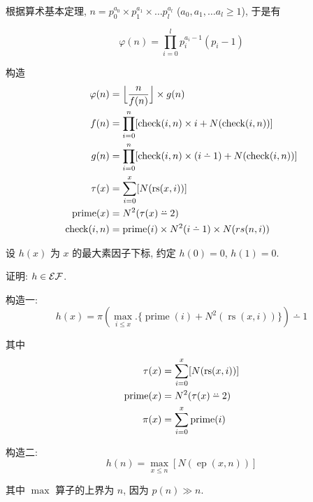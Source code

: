 \begin{solution}
根据算术基本定理, $n = p_0^{a_0} \times p_1^{a_1} \times \dots p_l^{a_l}$ ($a_0, a_1, \dots a_l \ge 1$), 于是有

\[
\varphi(n) = \prod_{i=0}^l p_i^{a_i - 1} (p_i - 1)
\]

构造
\begin{align*}
\varphi(n) & = \Big \lfloor \frac{n}{f(n)} \Big \rfloor \times g(n) \\
f(n) & = \prod_{i = 0}^n [\operatorname{check}(i, n) \times i + N(\operatorname{check}(i, n))] \\
g(n) & = \prod_{i = 0}^n [\operatorname{check}(i, n) \times (i \dotminus 1) + N(\operatorname{check}(i, n))] \\
\tau(x) & = \sum_{i = 0}^x [ N(\operatorname{rs}(x, i)) ] \\
\operatorname{prime}(x) & = N^2( \tau (x) \dotdotminus 2 ) \\
\operatorname{check}(i, n) & = \operatorname{prime}(i) \times N^2(i \dotminus 1) \times N(rs(n, i))
\end{align*}
\end{solution}

\begin{problem}
设 $h(x)$ 为 $x$ 的最大素因子下标, 约定 $h(0) = 0$, $h(1) = 0$.

证明: $h \in \mathcal{EF}$.
\end{problem}

\begin{solution}
构造一:
\[
h(x) = \pi(\max_{i \le x}. \Big \{ \operatorname{prime}(i) + N^2(\operatorname{rs}(x, i)) \Big \}) \dotminus 1
\]

其中
\begin{align*}
\tau(x) & = \sum_{i = 0}^x [ N(\operatorname{rs}(x, i)) ] \\
\operatorname{prime}(x) & = N^2( \tau (x) \dotdotminus 2 ) \\
\pi(x) & = \sum_{i=0}^x \operatorname{prime}(i)
\end{align*}

构造二:
\[
h(n) = \max_{x \le n} [N(\operatorname{ep}(x, n))]
\]

其中 $\max$ 算子的上界为 $n$, 因为 $p(n) \gg n$.
\end{solution}
